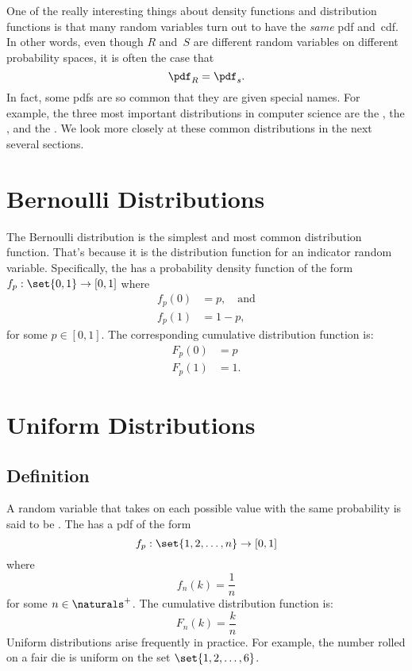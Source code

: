 One of the really interesting things about density functions and
distribution functions is that many random variables turn out to have
the \emph{same} pdf and~cdf.  In other words, even though $R$ and~$S$
are different random variables on different probability spaces, it is
often the case that
\begin{equation*}
    \pdf_R = \pdf_s.
\end{equation*}
In fact, some pdfs are so common that they are given special names.
For example, the three most important distributions in computer
science are the , the , and the .  We look more
closely at these common distributions in the next several sections.

\section{Bernoulli Distributions}\label{sec:bernoulli_dist}

The Bernoulli distribution is the simplest and most common
distribution function.  That's because it is the distribution function
for an indicator random variable.  Specifically, the  has a probability density function of the form $f_p:
\set{0, 1} \to [0, 1]$ where
\begin{align*}
    f_p(0) &= p, \quad\text{and} \\
    f_p(1) &= 1 - p,
\end{align*}
for some $p \in [0, 1]$.  The corresponding cumulative distribution
function is:
%
\begin{align*}
    F_p(0) & = p \\
    F_p(1) & = 1.
\end{align*}

\section{Uniform Distributions}\label{sec:uniform_dist}

\subsection{Definition}

A random variable that takes on each possible value with the same
probability is said to be .  The  has a pdf of the form
\begin{equation*}
    f_p : \set{1, 2, \dots, n} \to [0,1]
\end{equation*}
where
\begin{equation*}
    f_n(k) = \frac{1}{n}
\end{equation*}
for some $n \in \naturals^+$.  The cumulative distribution function
is:
\begin{equation*}
    F_n(k) = \frac{k}{n}
\end{equation*}
Uniform distributions arise frequently in practice.  For example, the
number rolled on a fair die is uniform on the set $\set{1, 2, \dots,
  6}$.


